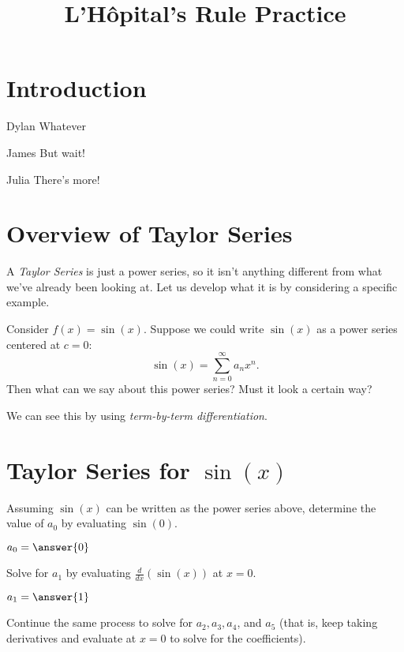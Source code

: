 \documentclass{ximera}
\title{L'H\^{o}pital's Rule Practice}
\begin{document}
\maketitle

\section*{Introduction}

\begin{dialogue}
\item[Dylan] Whatever
\item[James] But wait!
\item[Julia] There's more!
\end{dialogue}


\section{Overview of Taylor Series}

A \emph{Taylor Series} is just a power series, so it isn't anything different from what we've already been looking at. Let us develop what it is by considering a specific example.

Consider $f(x) = \sin(x)$. Suppose we could write $\sin(x)$ as a power series centered at $c=0$:
\[
    \sin(x) = \sum_{n=0}^{\infty} a_n x^n.
\]
Then what can we say about this power series? Must it look a certain way? 
\begin{multipleChoice}
\begin{feedback}[correct]
We can see this by using \emph{term-by-term differentiation}.
\end{feedback}
\end{multipleChoice}

\section{Taylor Series for $\sin(x)$}

Assuming $\sin(x)$ can be written as the power series above, determine the value of $a_0$ by evaluating $\sin(0)$.

$a_0 = \answer{0}$

Solve for $a_1$ by evaluating $\frac{d}{dx}(\sin(x))$ at $x=0$.

$a_1 = \answer{1}$

Continue the same process to solve for $a_2, a_3, a_4$, and $a_5$ (that is, keep taking derivatives and evaluate at $x=0$ to solve for the coefficients).
\end{document}
